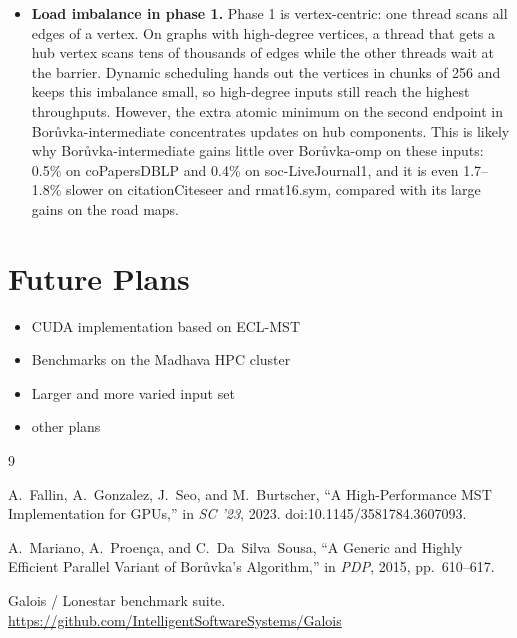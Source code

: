 \documentclass[11pt,a4paper]{article}
\begin{document}
\begin{itemize}
  \item \textbf{Load imbalance in phase 1.} Phase 1 is vertex-centric: one thread scans all edges of a vertex. On graphs with high-degree vertices, a thread that gets a hub vertex scans tens of thousands of edges while the other threads wait at the barrier. Dynamic scheduling hands out the vertices in chunks of 256 and keeps this imbalance small, so high-degree inputs still reach the highest throughputs. However, the extra atomic minimum on the second endpoint in Bor\r{u}vka-intermediate concentrates updates on hub components. This is likely why Bor\r{u}vka-intermediate gains little over Bor\r{u}vka-omp on these inputs: 0.5\% on coPapersDBLP and 0.4\% on soc-LiveJournal1, and it is even 1.7--1.8\% slower on citationCiteseer and rmat16.sym, compared with its large gains on the road maps.

\end{itemize}






\section*{Future Plans}
\begin{itemize}
  \item {CUDA implementation based on ECL-MST~\cite{fallin2023eclmst}}
  \item {Benchmarks on the Madhava HPC cluster}
  \item {Larger and more varied input set}
  \item {other plans}
\end{itemize}

\begin{thebibliography}{9}

A.~Fallin, A.~Gonzalez, J.~Seo, and M.~Burtscher,
``A High-Performance MST Implementation for GPUs,''
in \emph{SC '23}, 2023. doi:10.1145/3581784.3607093.

A.~Mariano, A.~Proen\c{c}a, and C.~Da~Silva~Sousa,
``A Generic and Highly Efficient Parallel Variant of Bor\r{u}vka's Algorithm,''
in \emph{PDP}, 2015, pp.~610--617.

Galois / Lonestar benchmark suite.
\url{https://github.com/IntelligentSoftwareSystems/Galois}

\end{thebibliography}
\end{document}
